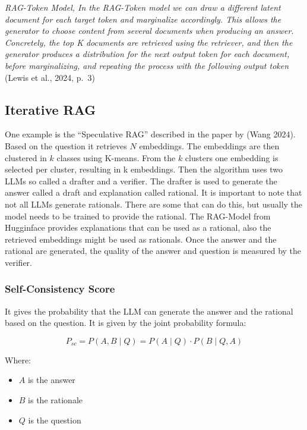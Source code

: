 \documentclass{wseas}
\begin{document}
\emph{RAG-Token Model, In the RAG-Token model we can draw a different
latent document for each target token and marginalize accordingly. This
allows the generator to choose content from several documents when
producing an answer. Concretely, the top K documents are retrieved using
the retriever, and then the generator produces a distribution for the
next output token for each document, before marginalizing, and repeating
the process with the following output token} (Lewis et al., 2024, p.~3)
\cite{cite3}

\subsection{Iterative RAG}

One example is the ``Speculative RAG'' described in the paper \cite{cite18}
by (Wang 2024). Based on the question it retrieves \(N\) embeddings. The
embeddings are then clustered in \(k\) classes using K-means. From the
\(k\) clusters one embedding is selected per cluster, resulting in k
embeddings. Then the algorithm uses two LLMs so called a drafter and a
verifier. The drafter is used to generate the answer called a draft and
explanation called rational. It is important to note that not all LLMs
generate rationals. There are some that can do this, but usually the
model needs to be trained to provide the rational. The RAG-Model from
Hugginface provides explanations that can be used as a rational, also
the retrieved embeddings might be used as rationals. Once the answer and
the rational are generated, the quality of the answer and question is
measured by the verifier.

\subsubsection{Self-Consistency Score}

It gives the probability that the LLM can generate the answer and the
rational based on the question. It is given by the joint probability
formula:

\begin{equation}
  P_{sc} = P(A,B \mid Q) = P(A \mid Q) \cdot P(B \mid Q, A)
\end{equation}
  
Where:
\begin{itemize}
  \item \( A \) is the answer
  \item \( B \) is the rationale
  \item \( Q \) is the question
\end{itemize}
\end{document}
